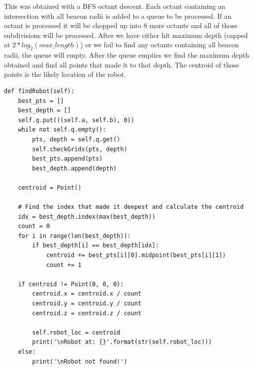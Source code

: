 \documentclass{article}
\begin{document}
This was obtained with a BFS octant descent. Each octant containing 
an intersection with all beacon radii is added to a queue to be processed. If 
an octant is processed it will be chopped up into 8 more octants and all of 
those subdivisions will be processed. After we have either hit maximum depth 
(capped at $2 * log_2(max\_length)$) or we fail to find any octants containing 
all beacon radii, the queue will empty. After the queue empties we find the 
maximum depth obtained and find all points that made it to that depth. The 
centroid of those points is the likely location of the robot. 

\newpage
\begin{verbatim}
def findRobot(self):
    best_pts = []
    best_depth = []
    self.q.put(((self.a, self.b), 0))
    while not self.q.empty():
        pts, depth = self.q.get()
        self.checkGrids(pts, depth)
        best_pts.append(pts)
        best_depth.append(depth)

    centroid = Point()

    # Find the index that made it deepest and calculate the centroid
    idx = best_depth.index(max(best_depth))
    count = 0
    for i in range(len(best_depth)):
        if best_depth[i] == best_depth[idx]:
            centroid += best_pts[i][0].midpoint(best_pts[i][1])
            count += 1

    if centroid != Point(0, 0, 0):
        centroid.x = centroid.x / count
        centroid.y = centroid.y / count
        centroid.z = centroid.z / count

        self.robot_loc = centroid
        print('\nRobot at: {}'.format(str(self.robot_loc)))
    else:
        print('\nRobot not found!')
\end{verbatim}
\end{document}
